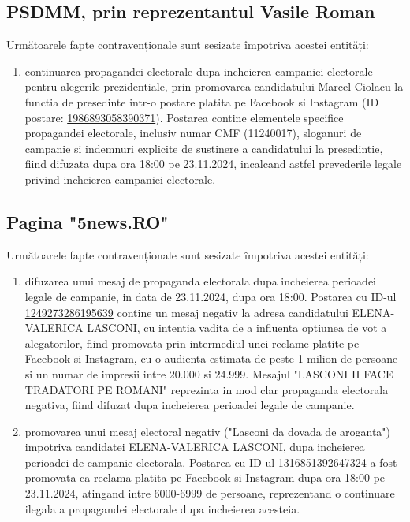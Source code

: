 \documentclass[a4paper,12pt]{article}
\begin{document}
\vspace{0.5cm}

\subsection{PSDMM, prin reprezentantul Vasile Roman}
Următoarele fapte contravenționale sunt sesizate împotriva acestei entități:

\begin{enumerate}[leftmargin=*, label=\arabic*.)]
    \item continuarea propagandei electorale dupa incheierea campaniei electorale pentru alegerile prezidentiale, prin promovarea candidatului Marcel Ciolacu la functia de presedinte intr-o postare platita pe Facebook si Instagram (ID postare: \href{https://www.facebook.com/ads/library/?id=1986893058390371}{1986893058390371}). Postarea contine elementele specifice propagandei electorale, inclusiv numar CMF (11240017), sloganuri de campanie si indemnuri explicite de sustinere a candidatului la presedintie, fiind difuzata dupa ora 18:00 pe 23.11.2024, incalcand astfel prevederile legale privind incheierea campaniei electorale.
\end{enumerate}

\vspace{0.5cm}

\subsection{Pagina "5news.RO"}
Următoarele fapte contravenționale sunt sesizate împotriva acestei entități:

\begin{enumerate}[leftmargin=*, label=\arabic*.)]
    \item difuzarea unui mesaj de propaganda electorala dupa incheierea perioadei legale de campanie, in data de 23.11.2024, dupa ora 18:00. Postarea cu ID-ul \href{https://www.facebook.com/ads/library/?id=1249273286195639}{1249273286195639} contine un mesaj negativ la adresa candidatului ELENA-VALERICA LASCONI, cu intentia vadita de a influenta optiunea de vot a alegatorilor, fiind promovata prin intermediul unei reclame platite pe Facebook si Instagram, cu o audienta estimata de peste 1 milion de persoane si un numar de impresii intre 20.000 si 24.999. Mesajul "LASCONI II FACE TRADATORI PE ROMANI" reprezinta in mod clar propaganda electorala negativa, fiind difuzat dupa incheierea perioadei legale de campanie.
    \item promovarea unui mesaj electoral negativ ("Lasconi da dovada de aroganta") impotriva candidatei ELENA-VALERICA LASCONI, dupa incheierea perioadei de campanie electorala. Postarea cu ID-ul \href{https://www.facebook.com/ads/library/?id=1316851392647324}{1316851392647324} a fost promovata ca reclama platita pe Facebook si Instagram dupa ora 18:00 pe 23.11.2024, atingand intre 6000-6999 de persoane, reprezentand o continuare ilegala a propagandei electorale dupa incheierea acesteia.
\end{enumerate}
\end{document}
